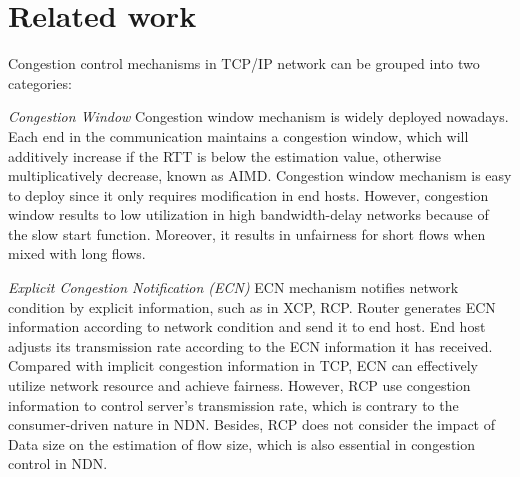 
\section{Related work}

\label{sec:related}




Congestion control mechanisms in TCP/IP network can be grouped into two categories:

\emph{Congestion Window} Congestion window mechanism is widely deployed nowadays. Each end in the communication maintains a congestion window, which will additively increase if the RTT is below the estimation value, otherwise multiplicatively decrease, known as AIMD\cite{TCP}. Congestion window mechanism is easy to deploy since it only requires modification in end hosts. However, congestion window results to low utilization in high bandwidth-delay networks because of the slow start function. Moreover, it results in unfairness for short flows when mixed with long flows.

\emph{Explicit Congestion Notification (ECN)} ECN mechanism notifies network condition by explicit information, such as in XCP\cite{XCP}, RCP\cite{RCP}. Router generates ECN information according to network condition and send it to end host. End host adjusts its transmission rate according to the ECN information it has received. Compared with implicit congestion information in TCP, ECN can effectively utilize network resource and achieve fairness. However, RCP use congestion information to control server's transmission rate, which is contrary to the consumer-driven nature in NDN. Besides, RCP does not consider the impact of Data size on the estimation of flow size, which is also essential in congestion control in NDN. 

